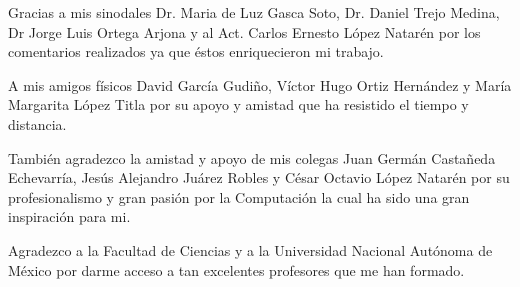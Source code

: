 \documentclass[letterpaper,twoside,openright]{book}
\begin{document}
Gracias a mis sinodales Dr. Maria de Luz Gasca Soto, Dr. Daniel Trejo Medina, Dr
Jorge Luis Ortega Arjona y al Act. Carlos Ernesto López Natarén por los comentarios
realizados ya que éstos enriquecieron mi trabajo.

A mis amigos físicos David García Gudiño, Víctor Hugo Ortiz Hernández y
María Margarita López Titla por su apoyo y amistad que ha resistido el tiempo y
distancia.

También agradezco la amistad y apoyo de mis colegas Juan Germán Castañeda Echevarría,
Jesús Alejandro Juárez Robles y César Octavio López Natarén por su profesionalismo y
gran pasión por la Computación la cual ha sido una gran inspiración para mi.

Agradezco a la Facultad de Ciencias y a la Universidad Nacional Autónoma de México
por darme acceso a tan excelentes profesores que me han formado.

\tableofcontents

\mainmatter








\backmatter



\printbibliography
\end{document}

